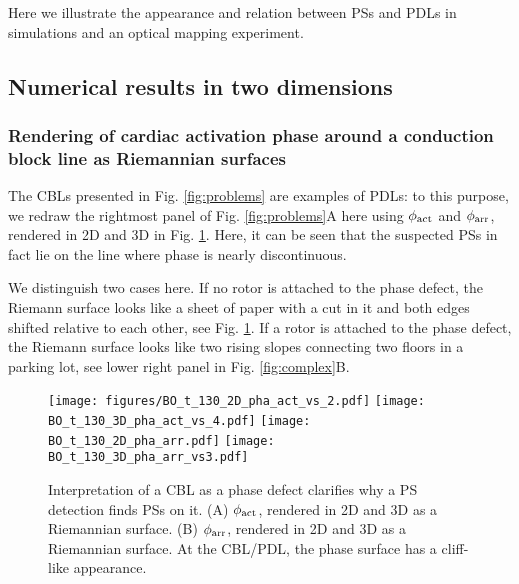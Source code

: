\documentclass{article}
\newcommand{\phiact}{\ensuremath{\phi_{\rm act}}}
\newcommand{\phiarr}{\ensuremath{\phi_{\rm arr}}}
\begin{document}
Here we illustrate the appearance and relation between PSs and PDLs in  simulations and an optical mapping experiment. 

\subsection{Numerical results in two dimensions}

\subsubsection{Rendering of cardiac activation phase around a conduction block line as Riemannian surfaces}
The CBLs presented in Fig. \ref{fig:problems} are examples of PDLs: to this purpose, we redraw the rightmost panel of Fig. \ref{fig:problems}A here using $\phiact$ and $\phiarr$, rendered in 2D and 3D in Fig. \ref{fig:CBL_Riemann}. Here, it can be seen that the suspected PSs in fact lie on the line where phase is nearly discontinuous. 

We distinguish two cases here. If no rotor is attached to the phase defect, the Riemann surface looks like a sheet of paper with a cut in it and both edges shifted relative to each other, see Fig. \ref{fig:CBL_Riemann}. If a rotor is attached to the phase defect, the Riemann surface looks like two rising slopes connecting two floors in a parking lot, see lower right panel in Fig. \ref{fig:complex}B. 

\begin{figure}
    \centering
{}    \texttt{[image: figures/BO\_t\_130\_2D\_pha\_act\_vs\_2.pdf]}
    \texttt{[image: BO\_t\_130\_3D\_pha\_act\_vs\_4.pdf]}
    \texttt{[image: BO\_t\_130\_2D\_pha\_arr.pdf]}
    \texttt{[image: BO\_t\_130\_3D\_pha\_arr\_vs3.pdf]} 
    \caption{Interpretation of a CBL as a phase defect clarifies why a PS detection finds PSs on it. (A) $\phiact$, rendered in 2D and 3D as a Riemannian surface. (B) $\phiarr$, rendered in 2D and 3D as a Riemannian surface. At the CBL/PDL, the phase surface has a cliff-like appearance. }
    \label{fig:CBL_Riemann}
\end{figure}
\end{document}
